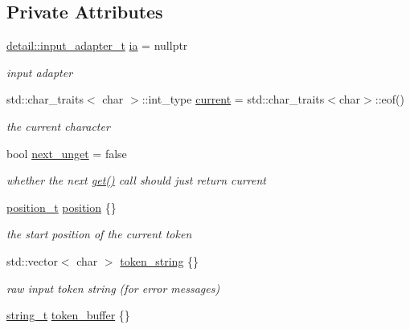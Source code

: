 \subsection*{Private Attributes}
\begin{DoxyCompactItemize}
\item 
\mbox{\hyperlink{namespacenlohmann_1_1detail_ae132f8cd5bb24c5e9b40ad0eafedf1c2}{detail\+::input\+\_\+adapter\+\_\+t}} \mbox{\hyperlink{classnlohmann_1_1detail_1_1lexer_aa7e69cd9d51451fd798eaf501b40421f}{ia}} = nullptr
\begin{DoxyCompactList}\small\item\em input adapter \end{DoxyCompactList}\item 
std\+::char\+\_\+traits$<$ char $>$\+::int\+\_\+type \mbox{\hyperlink{classnlohmann_1_1detail_1_1lexer_a47169f9aaf0da4c9885e61d3109859aa}{current}} = std\+::char\+\_\+traits$<$char$>$\+::eof()
\begin{DoxyCompactList}\small\item\em the current character \end{DoxyCompactList}\item 
bool \mbox{\hyperlink{classnlohmann_1_1detail_1_1lexer_ae8bedb97b907ba6347c5b2f2666ca01f}{next\+\_\+unget}} = false
\begin{DoxyCompactList}\small\item\em whether the next \mbox{\hyperlink{classnlohmann_1_1detail_1_1lexer_a901e45a34e1fb1d97ab62350b0c3ef26}{get()}} call should just return current \end{DoxyCompactList}\item 
\mbox{\hyperlink{structnlohmann_1_1detail_1_1position__t}{position\+\_\+t}} \mbox{\hyperlink{classnlohmann_1_1detail_1_1lexer_a932a1b4133619f08fc7442b52368385e}{position}} \{\}
\begin{DoxyCompactList}\small\item\em the start position of the current token \end{DoxyCompactList}\item 
std\+::vector$<$ char $>$ \mbox{\hyperlink{classnlohmann_1_1detail_1_1lexer_ad2960e3d54af8fb8d572a8f6f7731d62}{token\+\_\+string}} \{\}
\begin{DoxyCompactList}\small\item\em raw input token string (for error messages) \end{DoxyCompactList}\item 
\mbox{\hyperlink{classnlohmann_1_1detail_1_1lexer_ab63d35c658887592a4b09ad26eb4c795}{string\+\_\+t}} \mbox{\hyperlink{classnlohmann_1_1detail_1_1lexer_a8f43746570e5cadbc9b2b6b0c4c8e051}{token\+\_\+buffer}} \{\}

\end{DoxyCompactItemize}
